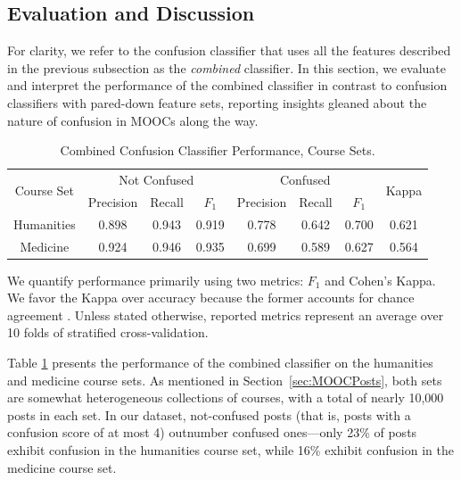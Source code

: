 \documentclass{edm_template}
\begin{document}
\subsection{Evaluation and Discussion}
For clarity, we refer to the confusion classifier that uses all the features
described in the previous subsection as the \emph{combined} classifier. In this section, we evaluate and interpret the performance of the combined classifier in contrast to confusion classifiers with pared-down feature sets, reporting insights gleaned about the nature of confusion in MOOCs along the way. 

\begin{table}[htp!]
    \centering
    \begin{tabular}{|c|c c c|c c c|c|}
    \hline
    \multirow{2}{*}{Course Set} & \multicolumn{3}{c|}{Not Confused} & \multicolumn{3}{c|}{Confused}  & \multirow{2}{*}{Kappa} \\ \cline{2-7}
                                &  Precision & Recall & $F_{1}$     &  Precision & Recall & $F_{1}$  &       \\ \hline
    Humanities                  & 0.898      & 0.943    & 0.919     & 0.778      & 0.642  & 0.700    & 0.621  \\ \hline
    Medicine                    & 0.924      & 0.946    & 0.935     & 0.699      & 0.589  & 0.627    & 0.564  \\ \hline

    \end{tabular}
    \caption{\textnormal{
       Combined Confusion Classifier Performance, Course Sets.
    }} %
    \label{table:confusion_sets} %
\end{table}

We quantify performance primarily using two metrics: $F_{1}$ and Cohen's Kappa. We favor the Kappa over accuracy because the former accounts for chance agreement \cite{cohen1960coefficient}. Unless stated otherwise, reported metrics represent an average over 10 folds of stratified cross-validation. 

Table \ref{table:confusion_sets} presents the performance of the combined classifier on the humanities and medicine course sets. As mentioned in Section~\ref{sec:MOOCPosts}, both sets are somewhat heterogeneous collections of courses, with a total of nearly 10,000 posts in each set. In our dataset, not-confused posts (that is, posts with a confusion score of at most 4) outnumber confused ones---only 23\% of posts exhibit confusion in the humanities course set, while 16\% exhibit confusion in the medicine course set.
\end{document}
